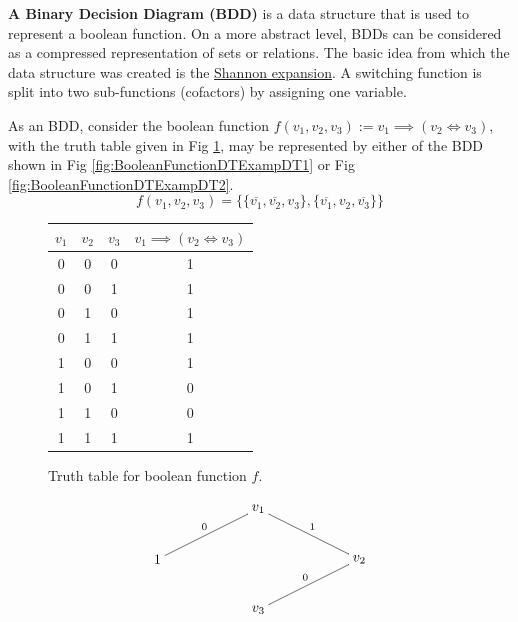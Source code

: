 \documentclass[12pt]{book}
\begin{document}
\begin{defi}\label{def:bdd} 
      \textbf{A Binary Decision Diagram (BDD)} is a data structure that is used to represent a boolean function. 
      On a more abstract level, BDDs can be considered as a compressed representation of sets or relations. 
      The basic idea from which the data structure was created is the \href{https://en.wikipedia.org/wiki/Boole%27s_expansion_theorem}{Shannon expansion}. 
	  A switching function is split into two sub-functions (cofactors) by assigning one variable. 
\end{defi} 
\begin{examp}\label{exp:bdd}
      As an BDD, consider the boolean function $f(v_1,v_2,v_3) := v_1 \implies (v_2 \iff v_3)$, with the truth table given in Fig \ref{fig:BooleanFunctionDTExampTT}, 
	  may be represented by either of the BDD shown in Fig \ref{fig:BooleanFunctionDTExampDT1} or Fig \ref{fig:BooleanFunctionDTExampDT2}. 
      $$f(v_1,v_2,v_3) = \{ \{ \overline{v_1},\overline{v_2}, v_3 \}, \{ \overline{v_1}, v_2, \overline{v_3}\} \}$$
      \begin{figure}[h]
            \centering
            \begin{tabular}{|c|c|c|c|} 
                  \hline
                  $v_1$ & $v_2$ & $v_3$ & $v_1 \implies (v_2 \iff v_3)$ \\ \hline
                  0 & 0 & 0 & 1 \\ \hline
                  0 & 0 & 1 & 1 \\ \hline
                  0 & 1 & 0 & 1 \\ \hline
                  0 & 1 & 1 & 1 \\ \hline
                  1 & 0 & 0 & 1 \\ \hline
                  1 & 0 & 1 & 0 \\ \hline
                  1 & 1 & 0 & 0 \\ \hline
                  1 & 1 & 1 & 1 \\ \hline
            \end{tabular}
            \caption{Truth table for boolean function $f$.}
            \label{fig:BooleanFunctionDTExampTT}
      \end{figure}
      \begin{figure}[h]
            \centering
            \begin{displaymath}
                  \xygraph{
                  []{v_1} ( 
                  - [dll]{1}_0 (),
                  - [drr]{v_2}^1 (
                  - [dll]{v_3}_0 (
}
\end{displaymath}
\end{figure}
\end{examp}
\end{document}
